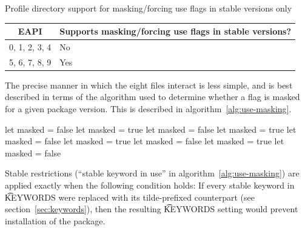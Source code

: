 \begin{centertable}{Profile directory support for masking/forcing use flags in stable versions only}
    \label{tab:profile-stablemask}
    \begin{tabular}{ll}
      \toprule
      \multicolumn{1}{c}{\textbf{EAPI}} &
      \multicolumn{1}{c}{\textbf{Supports masking/forcing use flags in stable versions?}} \\
      \midrule
      0, 1, 2, 3, 4     & No  \\
      5, 6, 7, 8, 9     & Yes \\
      \bottomrule
    \end{tabular}
\end{centertable}

The precise manner in which the eight files interact is less simple, and is best described in terms
of the algorithm used to determine whether a flag is masked for a given package version. This is
described in algorithm~\ref{alg:use-masking}.
\begin{algorithm}
\caption{\t{USE} masking logic} \label{alg:use-masking}
\begin{algorithmic}[1]
\STATE let masked = false
        \STATE let masked = true
        \STATE let masked = false
    \ENDIF
            \STATE let masked = true
            \STATE let masked = false
        \ENDIF
    \ENDIF
            \STATE let masked = true
            \STATE let masked = false
        \ENDIF
    \ENDFOR
                \STATE let masked = true
                \STATE let masked = false
            \ENDIF
        \ENDFOR
    \ENDIF
\ENDFOR
\end{algorithmic}
\end{algorithm}

Stable restrictions (``stable keyword in use'' in algorithm~\ref{alg:use-masking}) are applied
exactly when the following condition holds: If every stable keyword in \t{KEYWORDS} were replaced
with its tilde-prefixed counterpart (see section~\ref{sec:keywords}), then the resulting
\t{KEYWORDS} setting would prevent installation of the package.

